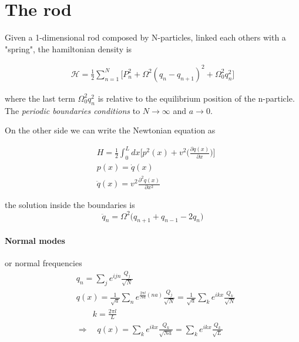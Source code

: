 \documentclass[class=article]{standalone}
\begin{document}
\section{The rod}

Given a 1-dimensional rod composed by N-particles, linked each others with a "spring", the hamiltonian density is

\begin{equation*}
\begin{split}
\mathcal{H} = \frac{1}{2} \sum_{n=1}^{N} \Big[  P_n^2 + \Omega^2 (q_n - q_{n+1})^2 + \Omega_0^2 q_n^2 \Big]
\end{split}
\end{equation*}

where the last term $\Omega_0^2 q_n^2$ is relative to the equilibrium position of the n-particle.
The \emph{periodic boundaries conditions} to $N \to \infty$ and $a \to 0$.

On the other side we can write the Newtonian equation as 

\begin{equation*}
\begin{split}
& H = \frac{1}{2} \int_{0}^{L} dx \Big[ p^2(x) + v^2 \Big( \frac{\partial q(x)}{\partial x} \Big) \Big] \\
&  p(x) = \dot q(x) \\
&  \ddot q(x) = v^2 \frac{\partial^2 q(x)}{\partial x^2}
\end{split}
\end{equation*}

the solution inside the boundaries is
\begin{equation*}
\ddot q_n = \Omega^2 \Big( q_{n+1} + q_{n-1} -2 q_n \Big)
\end{equation*}


\paragraph{Normal modes} or normal frequencies
\begin{equation*}
\begin{split}
& q_n = \sum_j e^{i j n} \frac{Q_j}{\sqrt{N}} \\
& q(x) =  \frac{1}{\sqrt{a} } \sum_n e^{ \frac{2 \pi l}{N a} (n a) } \frac{Q_j}{\sqrt{N}}  = \frac{1}{\sqrt{a} }  \sum_k e^{i k x} \frac{Q_k}{\sqrt{N}} \\
& \quad\quad k = \frac{2 \pi l}{L} \\
& \Rightarrow\quad q(x) =  \sum_k e^{i k x} \frac{Q_k}{\sqrt{N a}} =  \sum_k e^{i k x} \frac{Q_k}{\sqrt{L}}
\end{split}
\end{equation*}
\end{document}
